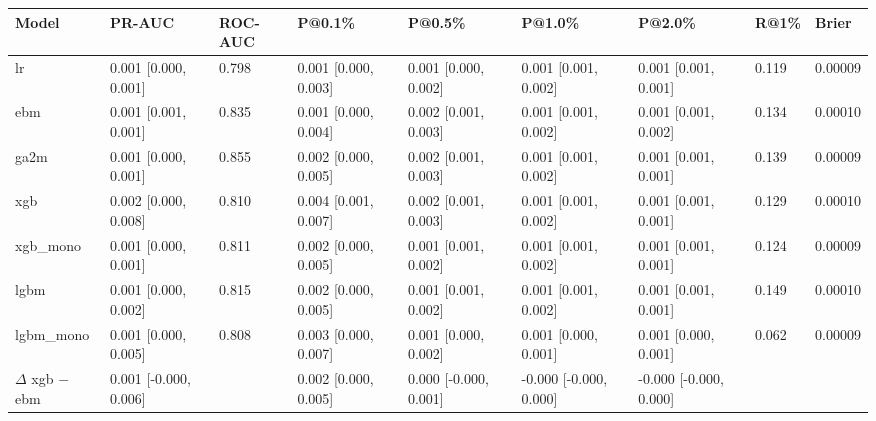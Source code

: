 \begin{tabular}{lllllllll}
\hline
Model & PR-AUC & ROC-AUC & P@0.1\% & P@0.5\% & P@1.0\% & P@2.0\% & R@1\% & Brier \\
\hline
lr & 0.001 [0.000, 0.001] & 0.798 & 0.001 [0.000, 0.003] & 0.001 [0.000, 0.002] & 0.001 [0.001, 0.002] & 0.001 [0.001, 0.001] & 0.119 & 0.00009 \\
ebm & 0.001 [0.001, 0.001] & 0.835 & 0.001 [0.000, 0.004] & 0.002 [0.001, 0.003] & 0.001 [0.001, 0.002] & 0.001 [0.001, 0.002] & 0.134 & 0.00010 \\
ga2m & 0.001 [0.000, 0.001] & 0.855 & 0.002 [0.000, 0.005] & 0.002 [0.001, 0.003] & 0.001 [0.001, 0.002] & 0.001 [0.001, 0.001] & 0.139 & 0.00009 \\
xgb & 0.002 [0.000, 0.008] & 0.810 & 0.004 [0.001, 0.007] & 0.002 [0.001, 0.003] & 0.001 [0.001, 0.002] & 0.001 [0.001, 0.001] & 0.129 & 0.00010 \\
xgb\_mono & 0.001 [0.000, 0.001] & 0.811 & 0.002 [0.000, 0.005] & 0.001 [0.001, 0.002] & 0.001 [0.001, 0.002] & 0.001 [0.001, 0.001] & 0.124 & 0.00009 \\
lgbm & 0.001 [0.000, 0.002] & 0.815 & 0.002 [0.000, 0.005] & 0.001 [0.001, 0.002] & 0.001 [0.001, 0.002] & 0.001 [0.001, 0.001] & 0.149 & 0.00010 \\
lgbm\_mono & 0.001 [0.000, 0.005] & 0.808 & 0.003 [0.000, 0.007] & 0.001 [0.000, 0.002] & 0.001 [0.000, 0.001] & 0.001 [0.000, 0.001] & 0.062 & 0.00009 \\
$\Delta$ xgb $-$ ebm & 0.001 [-0.000, 0.006] &  & 0.002 [0.000, 0.005] & 0.000 [-0.000, 0.001] & -0.000 [-0.000, 0.000] & -0.000 [-0.000, 0.000] &  &  \\
\hline
\end{tabular}
